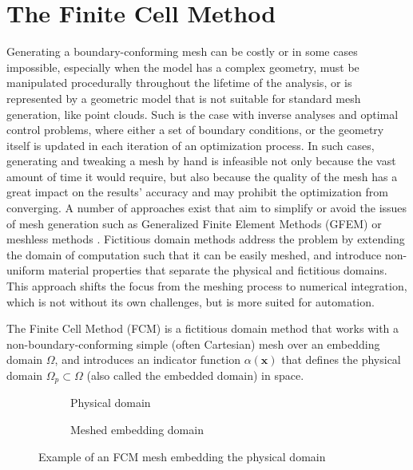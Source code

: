 %
\section{The Finite Cell Method}
\label{section:fcm}
%

Generating a boundary-conforming mesh can be costly or in some cases impossible,
especially when the model has a complex geometry, must be manipulated procedurally throughout the lifetime
of the analysis, or is represented by a geometric model that is not suitable for standard mesh generation, like point clouds.
Such is the case with inverse analyses and optimal control problems, where either
a set of boundary conditions, or the geometry itself is updated in each iteration of an
optimization process. In such cases, generating and tweaking a mesh by hand is infeasible not only because the vast amount of time it would require, but also because the quality of the mesh has a great impact on the results' accuracy and may prohibit the optimization from converging. A number of approaches exist that aim to simplify or avoid the issues of mesh generation such as Generalized Finite Element Methods (GFEM) \cite{Babuska2004} or meshless methods \cite{Chen2006}. Fictitious domain methods address the problem by extending the domain of computation such that it can be easily meshed, and introduce non-uniform material properties that separate the physical and fictitious domains. This approach shifts the focus from the meshing process to numerical integration, which is not
without its own challenges, but is more suited for automation.

The Finite Cell Method (FCM) is a fictitious domain method that works with a non-boundary-conforming
simple (often Cartesian) mesh over an embedding domain  $\Omega$, and introduces an indicator function $\alpha(\mathbf x)$ that defines the
physical domain $\Omega_p \subset \Omega$ (also called the embedded domain) in space. 

\begin{figure}[h] \label{fig:fcm_potato}
	\centering
	\begin{subfigure}[t]{0.49\textwidth}
		\centering
		\caption{Physical domain}
	\end{subfigure}
	\begin{subfigure}[t]{0.49\textwidth}
		\centering
		\caption{Meshed embedding domain}
	\end{subfigure}
\caption{Example of an FCM mesh embedding the physical domain}
\end{figure}

